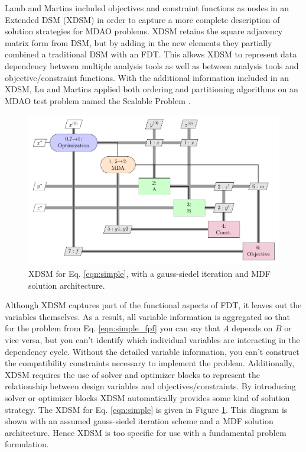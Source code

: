     Lamb and Martins included objectives and constraint functions as nodes in an Extended 
    DSM (XDSM) in order to capture a more complete description of solution strategies for MDAO problems\cite{Lambe2012}. 
    XDSM retains the square adjacency matrix form from DSM, but by adding in the 
    new elements they partially combined a traditional DSM with an FDT. 
    This allows XDSM to represent data dependency between multiple analysis tools as well as between analysis tools and
    objective/constraint functions. With the additional information included in an 
    XDSM, Lu and Martins applied both ordering and partitioning 
    algorithms on an MDAO test problem named the Scalable Problem \cite{Lu2012}. 

    \begin{figure}
        \begin{center}
        \includegraphics[height=.25\textheight]{XDSM/simple}
        \caption{XDSM for Eq. \ref{eqn:simple}, with a gauss-siedel iteration and MDF solution architecture. \label{fig:XDSM_simple}}
        \end{center}
    \end{figure}

    Although XDSM captures part of the functional aspects of FDT, it leaves out the variables themselves.  
    As a result, all variable information is aggregated 
    so that for the problem from Eq. \ref{eqn:simple_fpf} you can say that $A$ 
    depends on $B$ or vice versa, but you can't identify which 
    individual variables are interacting in the dependency cycle. 
    Without the detailed variable information, you can't construct the compatibility 
    constraints necessary to implement the problem. Additionally, XDSM 
    requires the use of solver and optimizer blocks to represent 
    the relationship between design variables and objectives/constraints. 
    By introducing solver or optimizer blocks XDSM automatically provides
    some kind of solution strategy. The XDSM for Eq. \ref{eqn:simple} is 
    given in Figure \ref{fig:XDSM_simple}. This diagram is shown with an 
    assumed gauss-siedel iteration scheme and a MDF solution architecture. 
    Hence XDSM is too specific for use with a fundamental problem formulation. 


